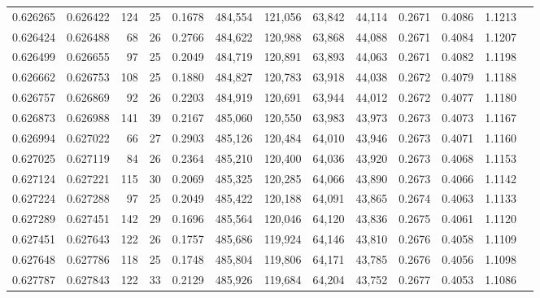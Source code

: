 \begin{tabular}{rrrrrrrrrrrrr}
0.626265 & 0.626422 &   124 &  25 &                                     0.1678 & 484,554 & 121,056 &  63,842 &  44,114 & 0.2671 & 0.4086 & 1.1213 \\
0.626424 & 0.626488 &    68 &  26 &                                     0.2766 & 484,622 & 120,988 &  63,868 &  44,088 & 0.2671 & 0.4084 & 1.1207 \\
0.626499 & 0.626655 &    97 &  25 &                                     0.2049 & 484,719 & 120,891 &  63,893 &  44,063 & 0.2671 & 0.4082 & 1.1198 \\
0.626662 & 0.626753 &   108 &  25 &                                     0.1880 & 484,827 & 120,783 &  63,918 &  44,038 & 0.2672 & 0.4079 & 1.1188 \\
0.626757 & 0.626869 &    92 &  26 &                                     0.2203 & 484,919 & 120,691 &  63,944 &  44,012 & 0.2672 & 0.4077 & 1.1180 \\
0.626873 & 0.626988 &   141 &  39 &                                     0.2167 & 485,060 & 120,550 &  63,983 &  43,973 & 0.2673 & 0.4073 & 1.1167 \\
0.626994 & 0.627022 &    66 &  27 &                                     0.2903 & 485,126 & 120,484 &  64,010 &  43,946 & 0.2673 & 0.4071 & 1.1160 \\
0.627025 & 0.627119 &    84 &  26 &                                     0.2364 & 485,210 & 120,400 &  64,036 &  43,920 & 0.2673 & 0.4068 & 1.1153 \\
0.627124 & 0.627221 &   115 &  30 &                                     0.2069 & 485,325 & 120,285 &  64,066 &  43,890 & 0.2673 & 0.4066 & 1.1142 \\
0.627224 & 0.627288 &    97 &  25 &                                     0.2049 & 485,422 & 120,188 &  64,091 &  43,865 & 0.2674 & 0.4063 & 1.1133 \\
0.627289 & 0.627451 &   142 &  29 &                                     0.1696 & 485,564 & 120,046 &  64,120 &  43,836 & 0.2675 & 0.4061 & 1.1120 \\
0.627451 & 0.627643 &   122 &  26 &                                     0.1757 & 485,686 & 119,924 &  64,146 &  43,810 & 0.2676 & 0.4058 & 1.1109 \\
0.627648 & 0.627786 &   118 &  25 &                                     0.1748 & 485,804 & 119,806 &  64,171 &  43,785 & 0.2676 & 0.4056 & 1.1098 \\
0.627787 & 0.627843 &   122 &  33 &                                     0.2129 & 485,926 & 119,684 &  64,204 &  43,752 & 0.2677 & 0.4053 & 1.1086 \\

\end{tabular}

